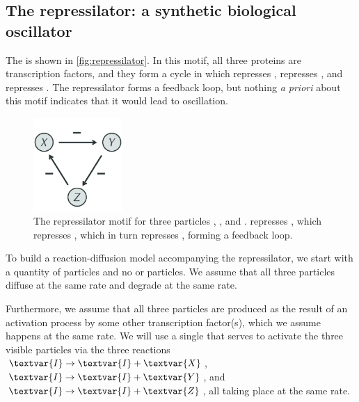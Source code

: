 \FloatBarrier
{}
\subsection{The repressilator: a synthetic biological oscillator}

The  is shown in \autoref{fig:repressilator}. In this motif, all three proteins are transcription factors, and they form a cycle in which  represses ,  represses , and  represses . The repressilator forms a feedback loop, but nothing \textit{a priori} about this motif indicates that it would lead to oscillation.\\

\begin{figure}[h]
\centering
\mySfFamily
\includegraphics[width = 0.3\textwidth]{../images_CMYK/repressilator}
\caption{The repressilator motif for three particles , , and .  represses , which represses , which in turn represses , forming a feedback loop.}
\label{fig:repressilator}
\end{figure}

\begin{qbox}\end{qbox}

To build a reaction-diffusion model accompanying the repressilator, we start with a quantity of  particles and no  or  particles. We assume that all three particles diffuse at the same rate and degrade at the same rate.

Furthermore, we assume that all three particles are produced as the result of an activation process by some other transcription factor(s), which we assume happens at the same rate. We will use a single   that serves to activate the three visible particles via the three reactions $\textvar{I} \rightarrow \textvar{I} + \textvar{X}$, $\textvar{I} \rightarrow \textvar{I} + \textvar{Y}$, and $\textvar{I} \rightarrow \textvar{I} + \textvar{Z}$, all taking place at the same rate.

